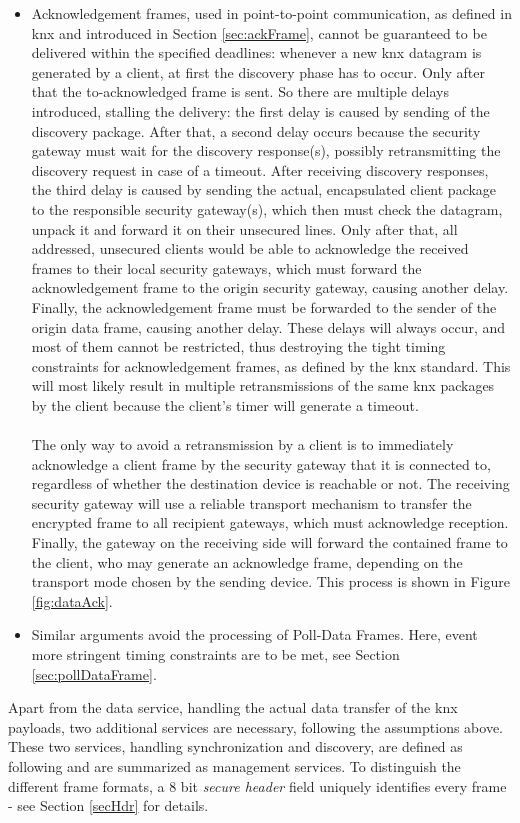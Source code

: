 \begin{itemize}
 \item Acknowledgement frames, used in point-to-point communication, as defined in \gls{knx} and introduced in Section \ref{sec:ackFrame}, cannot be guaranteed to be
 delivered within the specified deadlines: whenever
 a new \gls{knx} datagram is generated by a client, at first the discovery phase has to occur. Only after that the to-acknowledged frame is sent. So there are
 multiple delays introduced, stalling the delivery: the first delay is caused by sending of the discovery package.
 After that, a second delay occurs because the security gateway must wait for the discovery response(s), possibly retransmitting the discovery request
 in case of a timeout. After receiving discovery responses, the third delay is caused by sending the actual, encapsulated
 client package to the responsible security gateway(s), which then must check the datagram, unpack it and forward it on their unsecured lines.
 Only after that, all addressed, unsecured clients would be able to acknowledge the received frames
 to their local security gateways,
 which must forward the acknowledgement frame to the origin security gateway, causing another delay. Finally, the acknowledgement frame must be forwarded to the sender of
 the origin data frame, causing another delay.
 These delays will always occur, and most of them cannot be restricted, thus destroying the tight timing constraints for acknowledgement frames, as defined
 by the \gls{knx} standard. This
 will most likely result in multiple retransmissions of the same \gls{knx} packages
 by the client because the client's timer will generate a timeout. 
 \\
 \\
 The only way to avoid a retransmission by a client is to immediately acknowledge a client frame by the security
 gateway that it is connected to, regardless of whether the destination device is reachable or not. The receiving security gateway will use a reliable transport
 mechanism to transfer the encrypted frame to all recipient gateways, which must acknowledge reception.
 Finally, the gateway on the receiving side will forward the contained frame to the client, who may generate an acknowledge frame, depending on the transport
 mode chosen by the sending device. This process is shown in Figure \ref{fig:dataAck}.
 \item Similar arguments avoid the processing of Poll-Data Frames. Here, event more stringent timing constraints are to be met, see Section \ref{sec:pollDataFrame}. 
\end{itemize}
Apart from the data service, handling the actual data transfer of the \gls{knx} payloads, two additional services are necessary, following the assumptions above.
These two services, handling synchronization and discovery, are defined as following and are summarized as management services. To distinguish the different
frame formats, a 8 bit \textit{secure header} field uniquely identifies every frame - see Section \ref{secHdr} for details.

